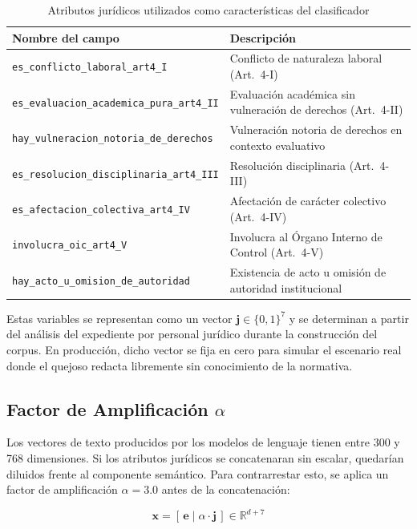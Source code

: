 \begin{table}[H]
\centering
\caption{Atributos jurídicos utilizados como características del clasificador}
\label{tab:campos_juridicos}
\begin{tabularx}{\textwidth}{lL}
\toprule
\textbf{Nombre del campo} & \textbf{Descripción} \\
\midrule
\texttt{es\_conflicto\_laboral\_art4\_I}
  & Conflicto de naturaleza laboral (Art.~4-I) \\
\texttt{es\_evaluacion\_academica\_pura\_art4\_II}
  & Evaluación académica sin vulneración de derechos (Art.~4-II) \\
\texttt{hay\_vulneracion\_notoria\_de\_derechos}
  & Vulneración notoria de derechos en contexto evaluativo \\
\texttt{es\_resolucion\_disciplinaria\_art4\_III}
  & Resolución disciplinaria (Art.~4-III) \\
\texttt{es\_afectacion\_colectiva\_art4\_IV}
  & Afectación de carácter colectivo (Art.~4-IV) \\
\texttt{involucra\_oic\_art4\_V}
  & Involucra al Órgano Interno de Control (Art.~4-V) \\
\texttt{hay\_acto\_u\_omision\_de\_autoridad}
  & Existencia de acto u omisión de autoridad institucional \\
\bottomrule
\end{tabularx}
\end{table}

Estas variables se representan como un vector $\mathbf{j} \in \{0,1\}^7$
y se determinan a partir del análisis del expediente por personal jurídico
durante la construcción del corpus. En producción, dicho vector se fija en
cero para simular el escenario real donde el quejoso redacta libremente sin
conocimiento de la normativa.

\subsection{Factor de Amplificación $\alpha$}
\label{subsec:amplificacion}

Los vectores de texto producidos por los modelos de lenguaje tienen entre
300 y 768 dimensiones. Si los atributos jurídicos se concatenaran sin
escalar, quedarían diluidos frente al componente semántico. Para
contrarrestar esto, se aplica un factor de amplificación $\alpha = 3.0$
antes de la concatenación:

\begin{equation}
  \mathbf{x} = \left[\, \mathbf{e} \;\Big|\; \alpha \cdot \mathbf{j}
  \,\right] \in \mathbb{R}^{d+7}
  \label{eq:vector_combinado}
\end{equation}

